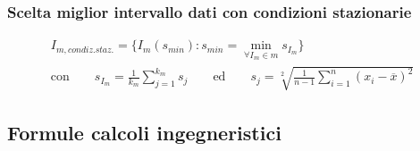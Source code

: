 \documentclass[a4paper,10pt]{article}                                                                                       %
\begin{document}
\subsubsection{Scelta miglior intervallo dati con condizioni stazionarie}                                                   %
\label{subsubsec:daf_interv}                                                                                                %
\vspace{1mm}                                                                                                                %
\begin{equation}                                                                                                            %
  \begin{aligned}                                                                                                           %
  \label{eqn:stat}                                                                                                          %
  I_{m,condiz.staz.} = \{I_m(s_{min}) : s_{min} = \min_{\forall I_m \in m} s_{I_m}\}\qquad\qquad                            %
  \\\text{con}\qquad                                                                                                        %
  s_{I_m} = \frac{1}{k_m}\sum_{j=1}^{k_m}{s_j}                                                                              %
  \qquad\text{ed}\qquad                                                                                                     %
  s_j = \sqrt[2]{\frac{1}{n-1}\sum_{i=1}^{n}(x_i-\overline{x})^2}                                                           %
  \end{aligned}                                                                                                             %
\end{equation}                                                                                                              %
\vspace{3mm}                                                                                                                %
\subsection{Formule calcoli ingegneristici}                                                                                 %
\label{subsec:ec_formulas}                                                                                                  %
\end{document}
